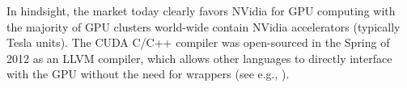 \documentclass{report}
\begin{document}
In hindsight, the market today clearly favors NVidia for GPU computing with the majority of GPU clusters world-wide contain NVidia accelerators (typically Tesla units). The CUDA C/C++ compiler was open-sourced in the Spring of 2012 as an LLVM compiler, which allows other languages to directly interface with the GPU without the need for wrappers (see e.g., \cite{NumbaPro}). 



%
%





\ifstandalone


\end{document}
